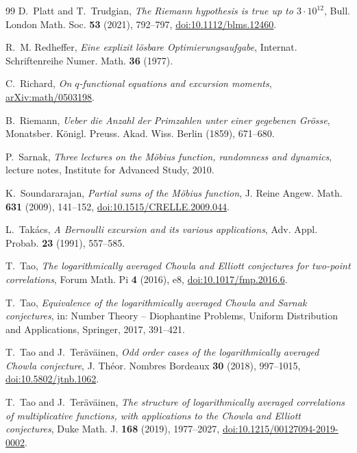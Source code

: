 \documentclass[11pt,reqno]{amsart}
\numberwithin{equation}{section}
\theoremstyle{plain}
\theoremstyle{definition}
\theoremstyle{remark}
\begin{document}
\begin{thebibliography}{99}
D.~Platt and T.~Trudgian, \emph{The Riemann hypothesis is true up to
$3\cdot10^{12}$}, Bull. London Math. Soc. \textbf{53} (2021), 792--797,
\href{https://doi.org/10.1112/blms.12460}{doi:10.1112/blms.12460}.

R.~M. Redheffer, \emph{Eine explizit l\"osbare Optimierungsaufgabe}, Internat.
Schriftenreihe Numer. Math. \textbf{36} (1977).

C.~Richard, \emph{On $q$-functional equations and excursion moments},
\href{https://arxiv.org/abs/math/0503198}{arXiv:math/0503198}.

B.~Riemann, \emph{Ueber die Anzahl der Primzahlen unter einer gegebenen
Gr\"osse}, Monatsber. K\"onigl. Preuss. Akad. Wiss. Berlin (1859), 671--680.

P.~Sarnak, \emph{Three lectures on the M\"obius function, randomness and
dynamics}, lecture notes, Institute for Advanced Study, 2010.

K.~Soundararajan, \emph{Partial sums of the M\"obius function}, J. Reine
Angew. Math. \textbf{631} (2009), 141--152,
\href{https://doi.org/10.1515/CRELLE.2009.044}{doi:10.1515/CRELLE.2009.044}.

L.~Tak\'acs, \emph{A Bernoulli excursion and its various applications},
Adv. Appl. Probab. \textbf{23} (1991), 557--585.

T.~Tao, \emph{The logarithmically averaged Chowla and Elliott conjectures for
two-point correlations}, Forum Math. Pi \textbf{4} (2016), e8,
\href{https://doi.org/10.1017/fmp.2016.6}{doi:10.1017/fmp.2016.6}.

T.~Tao, \emph{Equivalence of the logarithmically averaged Chowla and Sarnak
conjectures}, in: Number Theory -- Diophantine Problems, Uniform
Distribution and Applications, Springer, 2017, 391--421.

T.~Tao and J.~Ter\"av\"ainen, \emph{Odd order cases of the logarithmically
averaged Chowla conjecture}, J. Th\'eor. Nombres Bordeaux \textbf{30} (2018),
997--1015,
\href{https://doi.org/10.5802/jtnb.1062}{doi:10.5802/jtnb.1062}.

T.~Tao and J.~Ter\"av\"ainen, \emph{The structure of logarithmically averaged
correlations of multiplicative functions, with applications to the Chowla
and Elliott conjectures}, Duke Math. J. \textbf{168} (2019), 1977--2027,
\href{https://doi.org/10.1215/00127094-2019-0002}{doi:10.1215/00127094-2019-0002}.


\end{thebibliography}
\end{document}
